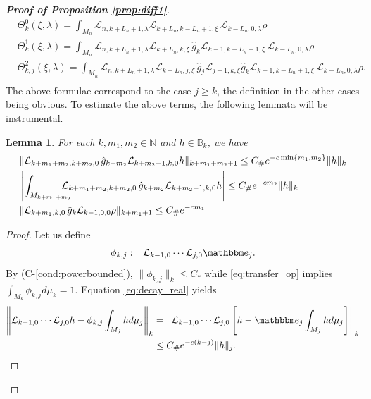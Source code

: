 \documentclass{amsart}
\numberwithin{equation}{section}
\newtheorem{lem}[thm]{Lemma}
\newcommand\cL{{\mathcal L}}
\newcommand\bB{{\mathbb B}}
\newcommand\bN{{\mathbb N}}
\newcommand{\bbe}{\mathbbm e}
\newcommand{\Const}{C_{\#}}
\begin{document}
\begin{proof}[\bf \em Proof of Proposition \ref{prop:diff1}]
\begin{equation}
\begin{split}
& \Theta^0_k(\xi,\lambda)=\int_{M_n}\!\!\!\!\!\!\cL_{n,k+L_n+1,\lambda}\cL_{k+L_n,k-L_n+1,\xi}\,\cL_{k-L_n,0,\lambda} \rho\\
& \Theta^1_{k}(\xi,\lambda)=\int_{M_n}\!\!\!\!\!\!\cL_{n,k+L_n+1,\lambda}\cL_{k+L_n, k,\xi}\,\hat g_k\cL_{k-1,k-L_n+1,\xi}\,\cL_{k-L_n,0,\lambda} \rho\\
& \Theta^2_{k,j}(\xi,\lambda)=\int_{M_n}\!\!\!\!\!\!\cL_{n,k+L_n+1,\lambda}\cL_{k+L_n, j,\xi}\,\hat g_j\cL_{j-1,k,\xi}\hat g_k\cL_{k-1,k-L_n+1,\xi}\,\cL_{k-L_n,0,\lambda} \rho.\\
\end{split}
\end{equation}
The above formulae correspond to the case $j\geq k$, the definition in the other cases being obvious. 
To estimate the above terms, the following lemmata will be instrumental.
\begin{lem}\label{lem:one}
For each $k, m_1, m_2 \in \bN$ and $h\in\bB_k$, we have
\[
\begin{split}
&\|\cL_{k+m_1+m_2,k+m_2,0}\,\hat g_{k+m_2}\cL_{k+m_2-1,k,0}h\|_{k+m_1+m_2+1}\leq\Const e^{-c\min\{m_1,m_2\}}\|h\|_k\\
&\left|\int_{M_{k+m_1+m_2}}\hskip-12pt\cL_{k+m_1+m_2,k+m_2,0}\,\hat g_{k+m_2}\cL_{k+m_2-1,k,0}h\right|\leq \Const e^{-c m_2}\|h\|_{k}\\
&\|\cL_{k+m_1,k,0}\,\hat g_{k}\cL_{k-1,0,0}\rho\|_{k+m_1+1}\leq\Const e^{-c m_1}
\end{split}
\]
\end{lem}
\begin{proof}
Let us define 
\begin{equation}\label{eq:phi_def}
\phi_{k,j}:=\cL_{k-1,0}\cdots\cL_{j,0}\bbe_j.
\end{equation}
By (C-\ref{cond:powerbounded}), $\|\phi_{k,j}\|_k\leq C_*$ while \eqref{eq:transfer_op} implies $\int_{M_k}\phi_{k,j} d\mu_k=1$.
Equation \eqref{eq:decay_real} yields
\begin{equation}\label{eq:memory}
\begin{split}
\left\|\cL_{k-1,0}\cdots \cL_{j,0}h-\phi_{k,j}\int_{M_j} h d\mu_j\right\|_{k}
&=\left\|\cL_{k-1,0}\cdots \cL_{j,0}\left[h-\bbe_j\int_{M_j} h d\mu_j\right]\right\|_{k}\\
&\leq  \Const e^{-c(k-j)}\|h\|_j.
\end{split}
\end{equation}

\end{proof}
\end{proof}
\end{document}
